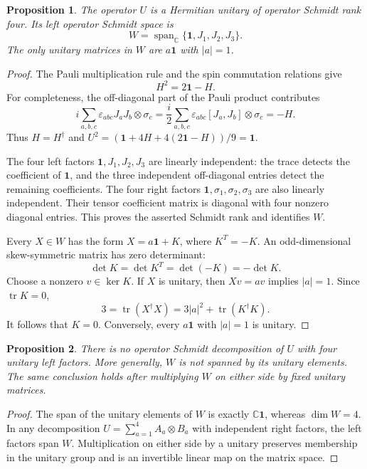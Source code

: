 \documentclass[11pt]{article}
\newtheorem{proposition}{Proposition}
\newcommand{\id}{\mathbf 1}
\begin{document}
\begin{proposition}\label{prop:reflection}
The operator $U$ is a Hermitian unitary of operator Schmidt rank four.
Its left operator Schmidt space is
\[
 W=\operatorname{span}_{\mathbb C}\{\id,J_1,J_2,J_3\}.
\]
The only unitary matrices in $W$ are $a\id$ with $|a|=1$.
\end{proposition}
\begin{proof}
The Pauli multiplication rule and the spin commutation relations give
\[
 H^2=2\id-H.
\]
For completeness, the off-diagonal part of the Pauli product contributes
\[
 i\sum_{a,b,c}\varepsilon_{abc}J_aJ_b\otimes\sigma_c
 =\frac{i}{2}\sum_{a,b,c}\varepsilon_{abc}[J_a,J_b]\otimes\sigma_c
 =-H.
\]
Thus $H=H^\dagger$ and
$U^2=(\id+4H+4(2\id-H))/9=\id$.

The four left factors $\id,J_1,J_2,J_3$ are linearly independent:
the trace detects the coefficient of $\id$, and the three
independent off-diagonal entries detect the remaining coefficients.
The four right factors $\id,\sigma_1,\sigma_2,\sigma_3$ are also
linearly independent. Their tensor coefficient matrix is diagonal with
four nonzero diagonal entries. This proves the asserted Schmidt rank
and identifies $W$.

Every $X\in W$ has the form $X=a\id+K$, where $K^T=-K$.
An odd-dimensional skew-symmetric matrix has zero determinant:
\[
 \det K=\det K^T=\det(-K)=-\det K.
\]
Choose a nonzero $v\in\ker K$. If $X$ is unitary, then
$Xv=av$ implies $|a|=1$. Since $\operatorname{tr}K=0$,
\[
 3=\operatorname{tr}(X^\dagger X)
   =3|a|^2+\operatorname{tr}(K^\dagger K).
\]
It follows that $K=0$. Conversely, every $a\id$ with $|a|=1$ is unitary.
\end{proof}

\begin{proposition}\label{prop:no-basis}
There is no operator Schmidt decomposition of $U$ with four unitary
left factors. More generally, $W$ is not spanned by its unitary elements.
The same conclusion holds after multiplying $W$ on either side by
fixed unitary matrices.
\end{proposition}
\begin{proof}
The span of the unitary elements of $W$ is exactly
$\mathbb C\id$, whereas $\dim W=4$. In any decomposition
$U=\sum_{a=1}^4A_a\otimes B_a$ with independent right factors,
the left factors span $W$. Multiplication on either side by a unitary
preserves membership in the unitary group and is an invertible linear
map on the matrix space.
\end{proof}
\end{document}
